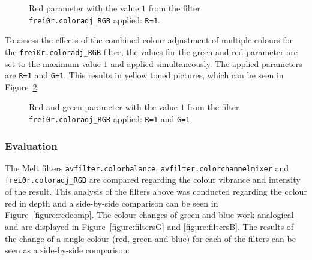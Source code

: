 \documentclass[../MasterThesis.tex]{subfiles}
\begin{document}
\begin{figure}[H]
	\begin{center}
		\label{figure:r}
		\caption[Red parameter set to $1$ with \texttt{frei0r.coloradj\_RGB}.]{Red parameter with the value $1$ from the filter \texttt{frei0r.coloradj\_RGB} applied: \texttt{R=1}.}
	\end{center}
\end{figure}

To assess the effects of the combined colour adjustment of multiple colours for the \texttt{frei0r.coloradj\_RGB} filter, the values for the green and red parameter are set to the maximum value $1$ and applied simultaneously. The applied parameters are \texttt{R=1} and \texttt{G=1}. This results in yellow toned pictures, which can be seen in Figure~\ref{figure:rg}.


\begin{figure}[H]
	\begin{center}
		\label{figure:rg}
		\caption[Red and green parameter set to $1$ with \texttt{frei0r.coloradj\_RGB}.]{Red and green parameter with the value $1$ from the filter \texttt{frei0r.coloradj\_RGB} applied: \texttt{R=1} and \texttt{G=1}.}
	\end{center}
\end{figure}




\subsubsection*{Evaluation}




The Melt filters \texttt{avfilter.colorbalance}, \texttt{avfilter\-.colorchannelmixer} and \texttt{frei\-0r\-.coloradj\_RGB} are compared regarding the colour vibrance and intensity of the result. This analysis of the filters above was conducted regarding the colour red in depth and a side-by-side comparison can be seen in Figure~\ref{figure:redcomp}. The colour changes of green and blue work analogical and are displayed in Figure~\ref{figure:filtersG} and \ref{figure:filtersB}.
%
The results of the change of a single colour (red, green and blue) for each of the filters can be seen as a side-by-side comparison:
\end{document}
